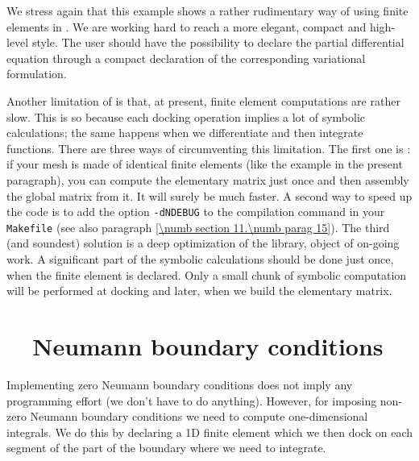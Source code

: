 We stress again that this example shows a rather rudimentary way of using finite elements in
\maniFEM.
We are working hard to reach a more elegant, compact and high-level style.
The user should have the possibility to declare the partial differential equation
through a compact declaration of the corresponding variational formulation.

Another limitation of {\maniFEM} is that, at present, finite element computations
are rather slow.
This is so because each docking operation implies a lot of symbolic calculations;
the same happens when we differentiate and then integrate functions.
There are three ways of circumventing this limitation.
The first one is : if your mesh is made of identical finite elements
(like the example in the present paragraph), you can compute the elementary matrix
just once and then assembly the global matrix from it.
It will surely be much faster.
A second way to speed up the code is to add the option {\small\tt -dNDEBUG} to the compilation
command in your {\small\tt Makefile} (see also paragraph \ref{\numb section 11.\numb parag 15}).
The third (and soundest) solution is a deep optimization of the {\maniFEM} library,
object of on-going work.
A significant part of the symbolic calculations should be done just once,
when the finite element is declared.
Only a small chunk of symbolic computation will be performed at docking and
later, when we build the elementary matrix.


\section{~~Neumann boundary conditions}\label{\numb section 6.\numb parag 3}

Implementing zero Neumann boundary conditions does not imply any programming effort
(we don't have to do anything).
However, for imposing non-zero Neumann boundary conditions we need to compute one-dimensional
integrals.
We do this by declaring a 1D finite element which we then dock on each segment of the
part of the boundary where we need to integrate.

